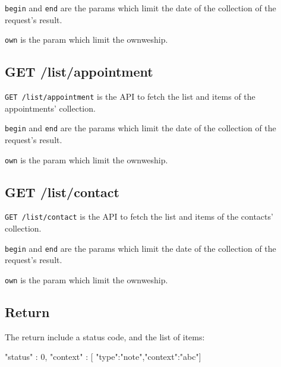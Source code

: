 \documentclass{article}
\begin{document}
  \verb|begin| and \verb|end| are the params which limit the date of the collection of the request's result.

  \verb|own| is the param which limit the ownweship.

  \subsection{GET /list/appointment}

  \verb|GET /list/appointment| is the API to fetch the list and items of the appointments' collection.

  \verb|begin| and \verb|end| are the params which limit the date of the collection of the request's result.

  \verb|own| is the param which limit the ownweship.

  \subsection{GET /list/contact}

  \verb|GET /list/contact| is the API to fetch the list and items of the contacts' collection.

  \verb|begin| and \verb|end| are the params which limit the date of the collection of the request's result.

  \verb|own| is the param which limit the ownweship.  

  \subsection{Return}

  The return include a status code, and the list of items:
  
  \begin{json}
 {
   "status" : 0,
   "context" : [ { "type":"note","context":"abc"}]
 }
  \end{json}
  
\end{document}
